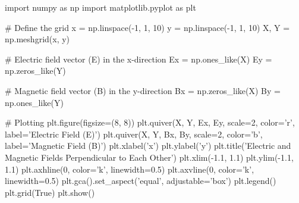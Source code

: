 import numpy as np
import matplotlib.pyplot as plt

# Define the grid
x = np.linspace(-1, 1, 10)
y = np.linspace(-1, 1, 10)
X, Y = np.meshgrid(x, y)

# Electric field vector (E) in the x-direction
Ex = np.ones_like(X)
Ey = np.zeros_like(Y)

# Magnetic field vector (B) in the y-direction
Bx = np.zeros_like(X)
By = np.ones_like(Y)

# Plotting
plt.figure(figsize=(8, 8))
plt.quiver(X, Y, Ex, Ey, scale=2, color='r', label='Electric Field (E)')
plt.quiver(X, Y, Bx, By, scale=2, color='b', label='Magnetic Field (B)')
plt.xlabel('x')
plt.ylabel('y')
plt.title('Electric and Magnetic Fields Perpendicular to Each Other')
plt.xlim(-1.1, 1.1)
plt.ylim(-1.1, 1.1)
plt.axhline(0, color='k', linewidth=0.5)
plt.axvline(0, color='k', linewidth=0.5)
plt.gca().set_aspect('equal', adjustable='box')
plt.legend()
plt.grid(True)
plt.show()

